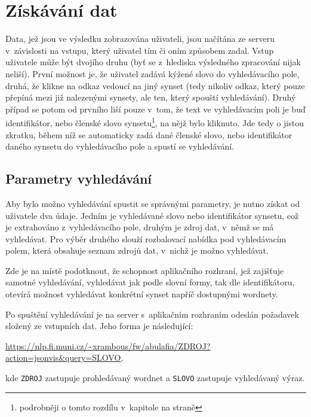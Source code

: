 \documentclass[a4paper,11pt,openany,twoside]{book}
\newcommand{\itNameRef}[1]{\textit{\nameref{#1}}}
\begin{document}
			\section{Získávání dat}
				
				Data, jež jsou ve výsledku zobrazována uživateli, jsou načítána ze serveru v~závislosti na vstupu, který uživatel tím či oním způsobem zadal. Vstup uživatele může být dvojího druhu (byť se z~hlediska výsledného zpracování nijak neliší). První možnost je, že uživatel zadává kýžené slovo do vyhledávacího pole, druhá, že klikne na odkaz vedoucí na jiný synset (tedy nikoliv odkaz, který pouze přepíná mezi již nalezenými synsety, ale ten, který spouští vyhledávání). Druhý případ se potom od prvního liší pouze v~tom, že text ve vyhledávacím poli je buď identifikátor, nebo členské slovo synsetu\footnote{podrobněji o tomto rozdílu v~kapitole \itNameRef{cha:textovarepres} na straně \pageref{cha:textovarepres}}, na nějž bylo kliknuto. Jde tedy o jistou zkratku, během níž se automaticky zadá dané členské slovo, nebo identifikátor daného synsetu do vyhledávacího pole a spustí se vyhledávání.

				\subsection{Parametry vyhledávání}
				
					Aby bylo možno vyhledávání spustit se správnými parametry, je nutno získat od uživatele dva údaje. Jedním je vyhledávané slovo nebo identifikátor synsetu, což je extrahováno z~vyhledávacího pole, druhým je zdroj dat, v~němž se má vyhledávat. Pro výběr druhého slouží rozbalovací nabídka pod vyhledávacím polem, která obsahuje seznam zdrojů dat, v~nichž je možno vyhledávat.

					Zde je na místě podotknout, že schopnost aplikačního rozhraní, jež zajišťuje samotné vyhledávání, vyhledávat jak podle slovní formy, tak dle identifikátoru, otevírá možnost vyhledávat konkrétní synset napříč dostupnými wordnety. 

					Po spuštění vyhledávání je na server s~aplikačním rozhraním odeslán požadavek složený ze vstupních dat. Jeho forma je následující:

					\medskip
					\url{https://nlp.fi.muni.cz/~xrambous/fw/abulafia/ZDROJ?action=jsonvis&query=SLOVO}\hspace{1em},
					\medskip

					kde \texttt{ZDROJ} zastupuje prohledávaný wordnet a \texttt{SLOVO} zastupuje vyhledávaný výraz.
\end{document}
